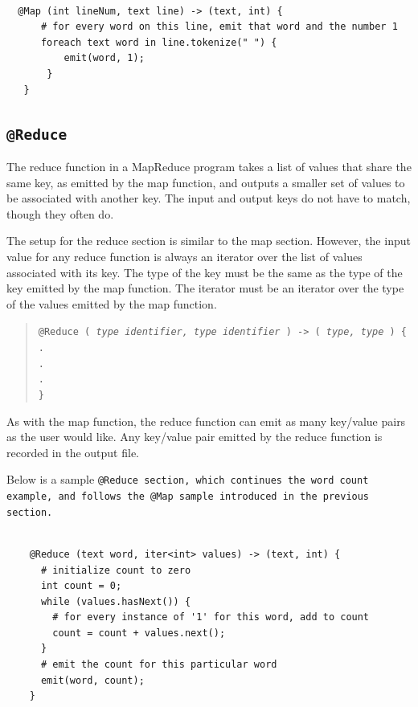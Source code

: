 \documentclass{report}
\begin{document}
\begin{verbatim}

  @Map (int lineNum, text line) -> (text, int) {
      # for every word on this line, emit that word and the number 1
      foreach text word in line.tokenize(" ") {
          emit(word, 1);
       }
   }

\end{verbatim}



\subsection{\tt @Reduce \rm} %
\label{sub:tt_reduce_rm}

The reduce function in a MapReduce program takes a list of values that share the
same key, as emitted by the map function, and outputs a smaller set of values to
be associated with another key. The input and output keys do not have to match,
though they often do.

The setup for the reduce section is similar to the map section. However, the input
value for any reduce function is always an iterator over the list of values
associated with its key. The type of the key must be the same as the type of the
key emitted by the map function. The iterator must be an iterator over the type of
the values emitted by the map function.

\begin{quotation}
  \tt @Reduce ( \rm \emph{type identifier, type identifier} \tt ) -> ( \rm \emph{type, type} \tt ) \{ \\
  \indent \indent . \\
  \indent \indent . \\
  \indent \indent . \\
  \indent \tt \} \rm
\end{quotation}

As with the map function, the reduce function can emit as many key/value pairs as
the user would like. Any key/value pair emitted by the reduce function is recorded
in the output file.

Below is a sample \tt @Reduce \rm section, which continues the word count example,
and follows the \tt @Map \rm sample introduced in the previous section.

\begin{verbatim} 

    @Reduce (text word, iter<int> values) -> (text, int) {
      # initialize count to zero
      int count = 0;
      while (values.hasNext()) {
        # for every instance of '1' for this word, add to count
        count = count + values.next();
      }
      # emit the count for this particular word
      emit(word, count);
    }

\end{verbatim} 
\end{document}
